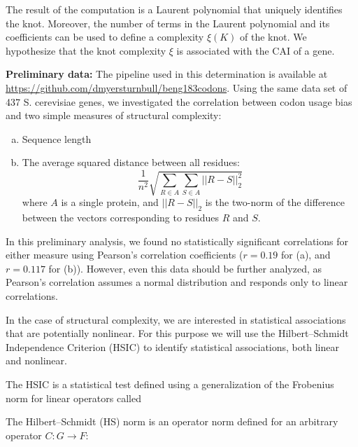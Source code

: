 \documentclass[11pt]{nih}
\begin{document}
\begin{enumerate}
The result of the computation is a Laurent polynomial that uniquely identifies the knot. Moreover, the number of terms in the Laurent polynomial and its coefficients can be used to define a complexity $\xi(K)$ of the knot. We hypothesize that the knot complexity $\xi$ is associated with the CAI of a gene.

\textbf{Preliminary data:} The pipeline used in this determination is available at \url{https://github.com/dmyersturnbull/beng183codons}. Using the same data set of 437 S. cerevisiae genes, we investigated the correlation between codon usage bias and two simple measures of structural complexity:
\begin{enumerate}[a)]
\item Sequence length
\item The average squared distance between all residues:\\
\begin{equation}
\displaystyle \frac{1}{n^2} \sqrt{\displaystyle \sum_{R \in A} \sum_{S \in A} ||R - S||_2^2 }
\end{equation}
where $A$ is a single protein, and $||R - S||_2$ is the two-norm of the difference between the vectors corresponding to residues $R$ and $S$.
\end{enumerate}

In this preliminary analysis, we found no statistically significant correlations for either measure using Pearson's correlation coefficients ($r = 0.19$ for (a), and $r = 0.117$ for (b)). However, even this data should be further analyzed, as Pearson's correlation assumes a normal distribution and responds only to linear correlations.

In the case of structural complexity, we are interested in statistical associations that are potentially nonlinear. For this purpose we will use the Hilbert--Schmidt Independence Criterion (HSIC) \cite{Gretton2005} to identify statistical associations, both linear and nonlinear.

The HSIC is a statistical test defined using a generalization of the Frobenius norm for linear operators called

The Hilbert--Schmidt (HS) norm is an operator norm defined for an arbitrary operator $C: G \rightarrow F$:


\end{enumerate}
\end{document}
